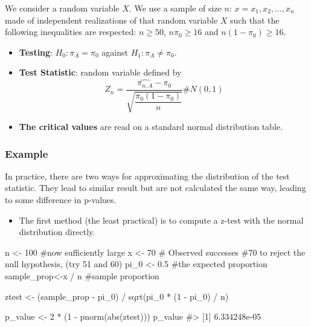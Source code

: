 \documentclass[
  letterpaper,
  DIV=11,
  numbers=noendperiod]{scrreprt}
\newenvironment{Shaded}{\begin{snugshade}}{\end{snugshade}}
\newcommand{\CommentTok}[1]{\textcolor[rgb]{0.37,0.37,0.37}{#1}}
\newcommand{\DecValTok}[1]{\textcolor[rgb]{0.68,0.00,0.00}{#1}}
\newcommand{\FloatTok}[1]{\textcolor[rgb]{0.68,0.00,0.00}{#1}}
\newcommand{\FunctionTok}[1]{\textcolor[rgb]{0.28,0.35,0.67}{#1}}
\newcommand{\NormalTok}[1]{\textcolor[rgb]{0.00,0.23,0.31}{#1}}
\newcommand{\OtherTok}[1]{\textcolor[rgb]{0.00,0.23,0.31}{#1}}
\newcommand{\SpecialCharTok}[1]{\textcolor[rgb]{0.37,0.37,0.37}{#1}}
\providecommand{\tightlist}{%
  \setlength{\itemsep}{0pt}\setlength{\parskip}{0pt}}\usepackage{longtable,booktabs,array}
\begin{document}
We consider a random variable \(X\). We use a sample of size \(n\):
\(x = {x_1, x_2,..., x_n}\) made of independent realizations of that
random variable \(X\) such that the following inequalities are
respected: \(n \ge 50\), \(n\pi_0 \ge 16\) and \(n(1-\pi_0) \ge 16\).

\begin{itemize}
\tightlist
\item
  \textbf{Testing}: \(H_0: \pi_A = \pi_0\) against
  \(H_1: \pi_A \neq \pi_0\).
\item
  \textbf{Test Statistic}: random variable defined by
  \[Z_n = \dfrac{\hat{\pi_{n,A}} - \pi_0}{\sqrt{\dfrac{\pi_0 (1-\pi_0)}{n}}} \# N(0, 1)\]
\item
  \textbf{The critical values} are read on a standard normal
  distribution table.
\end{itemize}

\subsubsection{Example}\label{example-6}

In practice, there are two ways for approximating the distribution of
the test statistic. They lead to similar result but are not calculated
the same way, leading to some difference in p-values.

\begin{itemize}
\tightlist
\item
  The first method (the least practical) is to compute a z-test with the
  normal distribution directly.
\end{itemize}

\begin{Shaded}
\begin{Highlighting}[]
\NormalTok{n }\OtherTok{\textless{}{-}} \DecValTok{100} \CommentTok{\#now sufficiently large}
\NormalTok{x }\OtherTok{\textless{}{-}} \DecValTok{70} \CommentTok{\# Observed successes \#70 to reject the null hypothesis, (try 51 and 60)}
\NormalTok{pi\_0 }\OtherTok{\textless{}{-}} \FloatTok{0.5} \CommentTok{\#the expected proportion}
\NormalTok{sample\_prop}\OtherTok{\textless{}{-}}\NormalTok{x }\SpecialCharTok{/}\NormalTok{ n }\CommentTok{\#sample proportion}

\NormalTok{ztest }\OtherTok{\textless{}{-}}\NormalTok{ (sample\_prop }\SpecialCharTok{{-}}\NormalTok{ pi\_0) }\SpecialCharTok{/} \FunctionTok{sqrt}\NormalTok{(pi\_0 }\SpecialCharTok{*}\NormalTok{ (}\DecValTok{1} \SpecialCharTok{{-}}\NormalTok{ pi\_0) }\SpecialCharTok{/}\NormalTok{ n)}

\NormalTok{p\_value }\OtherTok{\textless{}{-}} \DecValTok{2} \SpecialCharTok{*}\NormalTok{ (}\DecValTok{1} \SpecialCharTok{{-}} \FunctionTok{pnorm}\NormalTok{(}\FunctionTok{abs}\NormalTok{(ztest)))}
\NormalTok{p\_value}
\CommentTok{\#\textgreater{} [1] 6.334248e{-}05}
\end{Highlighting}
\end{Shaded}
\end{document}
